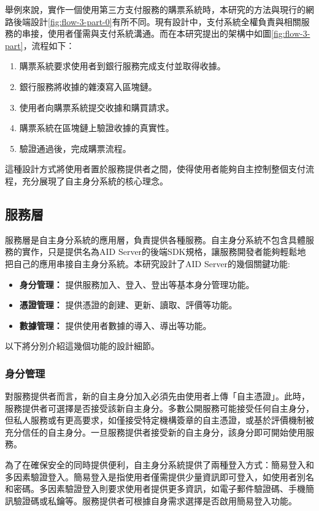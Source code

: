 舉例來說，實作一個使用第三方支付服務的購票系統時，本研究的方法與現行的網路後端設計\ref{fig:flow-3-part-0}有所不同。現有設計中，支付系統全權負責與相關服務的串接，使用者僅需與支付系統溝通。而在本研究提出的架構中如圖\ref{fig:flow-3-part}，流程如下：
\begin{enumerate}
  \item 購票系統要求使用者到銀行服務完成支付並取得收據。
  \item 銀行服務將收據的雜湊寫入區塊鏈。
  \item 使用者向購票系統提交收據和購買請求。
  \item 購票系統在區塊鏈上驗證收據的真實性。
  \item 驗證通過後，完成購票流程。
\end{enumerate}
這種設計方式將使用者置於服務提供者之間，使得使用者能夠自主控制整個支付流程，充分展現了自主身分系統的核心理念。
\subsection{服務層}
服務層是自主身分系統的應用層，負責提供各種服務。自主身分系統不包含具體服務的實作，只是提供名為AID Server的後端SDK規格，讓服務開發者能夠輕鬆地把自己的應用串接自主身分系統。本研究設計了AID Server的幾個關鍵功能:
\begin{itemize}
  \item \textbf{身分管理：} 提供服務加入、登入、登出等基本身分管理功能。
  \item \textbf{憑證管理：} 提供憑證的創建、更新、讀取、評價等功能。
  \item \textbf{數據管理：} 提供使用者數據的導入、導出等功能。
\end{itemize}
以下將分別介紹這幾個功能的設計細節。
\subsubsection{身分管理}
對服務提供者而言，新的自主身分加入必須先由使用者上傳「自主憑證」。此時，服務提供者可選擇是否接受該新自主身分。多數公開服務可能接受任何自主身分，但私人服務或有更高要求，如僅接受特定機構簽章的自主憑證，或基於評價機制被充分信任的自主身分。一旦服務提供者接受新的自主身分，該身分即可開始使用服務。

為了在確保安全的同時提供便利，自主身分系統提供了兩種登入方式：簡易登入和多因素驗證登入。簡易登入是指使用者僅需提供少量資訊即可登入，如使用者別名和密碼。多因素驗證登入則要求使用者提供更多資訊，如電子郵件驗證碼、手機簡訊驗證碼或私鑰等。服務提供者可根據自身需求選擇是否啟用簡易登入功能。

